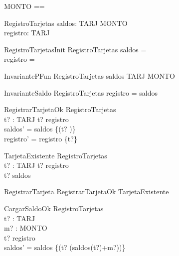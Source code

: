 \begin{zed}
[TARJ]
\end{zed}

\begin{zed}
MONTO == \nat 
\end{zed}

\begin{schema}{RegistroTarjetas}
    saldos: TARJ \rel MONTO \\
    registro: \power TARJ
\end{schema}

\begin{schema}{RegistroTarjetasInit}
    RegistroTarjetas
\where
    saldos = \emptyset \\
    registro = \emptyset
\end{schema}

\begin{schema}{InvariantePFun}
    RegistroTarjetas
\where
    saldos \in TARJ \pfun MONTO
\end{schema}

\begin{schema}{InvarianteSaldo}
    RegistroTarjetas
\where
    registro = \dom saldos
\end{schema}

\begin{schema}{RegistrarTarjetaOk}
    \Delta RegistroTarjetas \\
    t? : TARJ 
\where
    t? \notin registro \\ 
    saldos' = saldos \cup \{(t? )\} \\
    registro' = registro \cup \{t?\} 
\end{schema}

\begin{schema}{TarjetaExistente}
    \Xi RegistroTarjetas \\
    t? : TARJ 
\where
    t? \in registro \\
    t? \in \dom saldos 
\end{schema}

\begin{zed}
    RegistrarTarjeta  RegistrarTarjetaOk \lor TarjetaExistente \\
\end{zed}

\begin{schema}{CargarSaldoOk}
    \Delta RegistroTarjetas \\
    t? : TARJ \\
    m? : MONTO \\
\where
    t? \in registro \\
    saldos' = saldos \cup \{(t? \mapsto (saldos(t?)+m?))\} \\
\end{schema}

